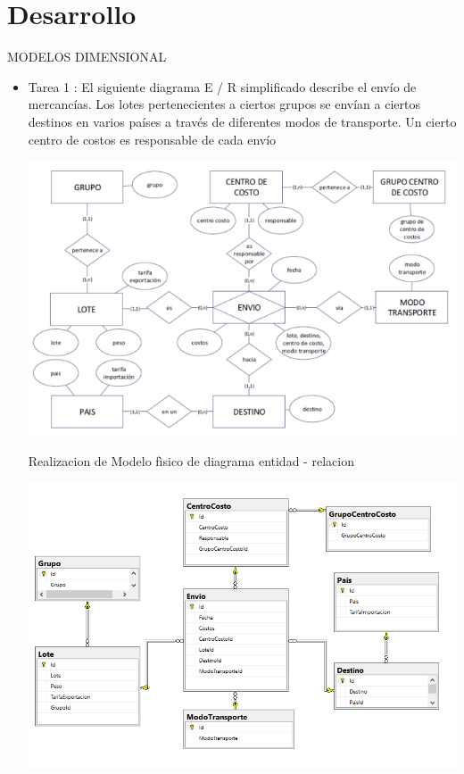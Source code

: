 \section{Desarrollo } 

MODELOS DIMENSIONAL
\begin{itemize}

\item Tarea 1 :
El siguiente diagrama E / R simplificado describe el envío de mercancías. Los lotes pertenecientes a ciertos grupos se
envían a ciertos destinos en varios países a través de diferentes modos de transporte. Un cierto centro de costos es
responsable de cada envío

\begin{center}
\includegraphics[width=14cm]{./Imagenes/tarea1.png}
\end{center}

Realizacion de Modelo fìsico de diagrama entidad - relacion

\begin{center}
\includegraphics[width=14cm]{./Imagenes/tarea111.png}
\end{center}


\end{itemize}
